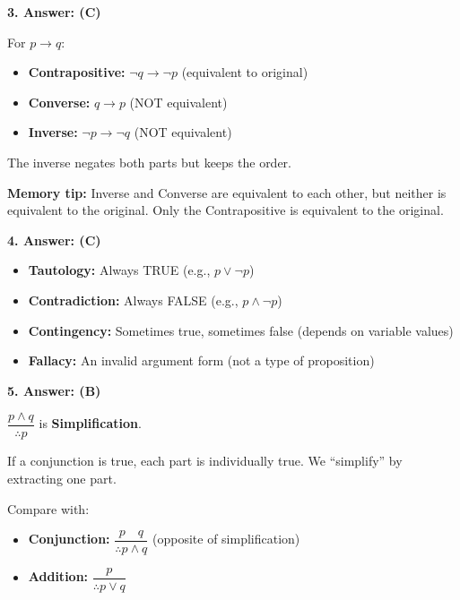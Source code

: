 \documentclass[11pt,a4paper]{article}
\begin{document}
\vspace{10pt}

\textbf{3. Answer: (C)}

\begin{solnbox}
For $p \to q$:
\begin{itemize}[noitemsep]
    \item \textbf{Contrapositive:} $\neg q \to \neg p$ (equivalent to original)
    \item \textbf{Converse:} $q \to p$ (NOT equivalent)
    \item \textbf{Inverse:} $\neg p \to \neg q$ (NOT equivalent)
\end{itemize}

The inverse negates both parts but keeps the order.

\textbf{Memory tip:} Inverse and Converse are equivalent to each other, but neither is equivalent to the original. Only the Contrapositive is equivalent to the original.
\end{solnbox}

\vspace{10pt}

\textbf{4. Answer: (C)}

\begin{solnbox}
\begin{itemize}[noitemsep]
    \item \textbf{Tautology:} Always TRUE (e.g., $p \lor \neg p$)
    \item \textbf{Contradiction:} Always FALSE (e.g., $p \land \neg p$)
    \item \textbf{Contingency:} Sometimes true, sometimes false (depends on variable values)
    \item \textbf{Fallacy:} An invalid argument form (not a type of proposition)
\end{itemize}
\end{solnbox}

\vspace{10pt}

\textbf{5. Answer: (B)}

\begin{solnbox}
$\dfrac{p \land q}{\therefore p}$ is \textbf{Simplification}.

If a conjunction is true, each part is individually true. We ``simplify'' by extracting one part.

Compare with:
\begin{itemize}[noitemsep]
    \item \textbf{Conjunction:} $\dfrac{p \quad q}{\therefore p \land q}$ (opposite of simplification)
    \item \textbf{Addition:} $\dfrac{p}{\therefore p \lor q}$
\end{itemize}
\end{solnbox}
\end{document}
